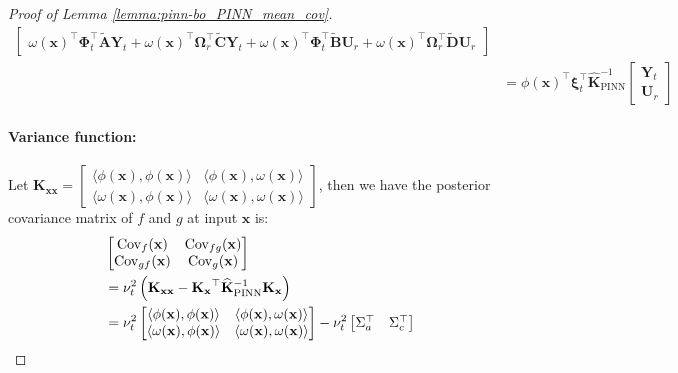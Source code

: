 \begin{proof} [Proof of Lemma \ref{lemma:pinn-bo_PINN_mean_cov}]
\begin{align*}
\begin{bmatrix}
         \omega(\mathbf{x})^\top \boldsymbol{\Phi}_t^\top \widetilde{\mathbf{A}} \mathbf{Y}_t +  \omega(\mathbf{x})^\top \boldsymbol{\Omega}_r ^\top  \widetilde{\mathbf{C}} \mathbf{Y}_t  +\omega(\mathbf{x})^\top \boldsymbol{\Phi}_t^\top \widetilde{\mathbf{B}} \mathbf{U}_r  +  \omega(\mathbf{x})^\top \boldsymbol{\Omega}_r ^\top  \widetilde{\mathbf{D}} \mathbf{U}_r
    \end{bmatrix}
        \\
         &=\phi(\mathbf{x})^\top \boldsymbol{\xi}_t^\top \mathbf{\widehat{K}}_\mathrm{PINN}^{-1} \begin{bmatrix}
         \mathbf{Y}_t \\
         \mathbf{U}_r\end{bmatrix}
\end{align*}

\paragraph{Variance function:}
Let $\mathbf{K}_{\mathbf{xx}} = \begin{bmatrix}
\langle \phi(\mathbf{x}), \phi(\mathbf{x}) \rangle & \langle \phi(\mathbf{x}), \omega(\mathbf{x}) \rangle \\
\langle \omega(\mathbf{x}), \phi(\mathbf{x}) \rangle & \langle \omega(\mathbf{x}), \omega(\mathbf{x}) \rangle
\end{bmatrix}$, then we have the posterior covariance matrix of $f$ and $g$ at input $\mathbf{x}$ is:
\begin{align*}
    &\begin{bmatrix}
    \mathrm{Cov}_f(\mathbf{x}) & \mathrm{Cov}_{fg}(\mathbf{x}) \\
    \mathrm{Cov}_{gf}(\mathbf{x}) & \mathrm{Cov}_g(\mathbf{x})
\end{bmatrix}  \\
&= \nu_t^2 \left(\mathbf{K}_{\mathbf{xx}} - \mathbf{K_x}^\top \mathbf{\widehat{K}}_\mathrm{PINN}^{-1} \mathbf{K_x} \right) \\
&= \nu_t^2   \begin{bmatrix}
\langle \phi(\mathbf{x}), \phi(\mathbf{x}) \rangle & \langle \phi(\mathbf{x}), \omega(\mathbf{x}) \rangle \notag \\
\langle \omega(\mathbf{x}), \phi(\mathbf{x}) \rangle & \langle \omega(\mathbf{x}), \omega(\mathbf{x}) \rangle
\end{bmatrix} - \nu_t^2
\begin{bmatrix}
        \Sigma_a^\top& \Sigma_c^\top \\

\end{bmatrix}
\end{align*}
\end{proof}
